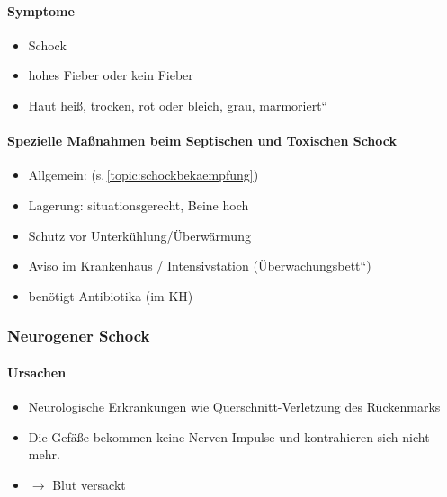 \paragraph{Symptome}

\begin{itemize}
\item Schock
\item hohes Fieber oder kein Fieber
\item Haut hei{\ss}, trocken, rot oder bleich, grau,
{\quotedblbase}marmoriert{\textquotedblleft}
\end{itemize}

\begin{gMassnahmenEnv}
    \paragraph{Spezielle Ma{\ss}nahmen beim Septischen und
    Toxischen Schock}
    
    \begin{itemize}
        \item Allgemein:  (s.\,\ref{topic:schockbekaempfung})
        \item Lagerung: situationsgerecht, Beine hoch
        \item Schutz vor Unterk\"uhlung/\"Uberw\"armung
        \item Aviso im Krankenhaus / Intensivstation
        ({\quotedblbase}\"Uberwachungsbett{\textquotedblleft})
        \item ben\"otigt Antibiotika (im KH)
    \end{itemize}
\end{gMassnahmenEnv}

\subsubsection{Neurogener Schock}

\paragraph{Ursachen} 

\begin{itemize}
    \item Neurologische Erkrankungen wie Querschnitt-Verletzung des
    R\"uckenmarks
    \item Die Gef\"a{\ss}e bekommen keine Nerven-Impulse und kontrahieren
    sich nicht mehr.
    \item ${\rightarrow}$ Blut versackt
\end{itemize}

